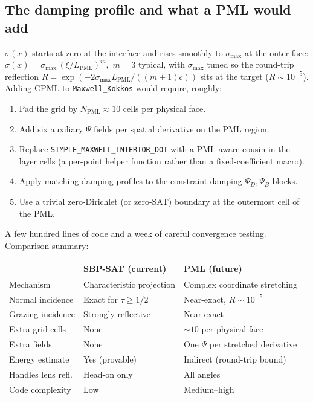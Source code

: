 \documentclass[11pt]{article}
\begin{document}
\subsection{The damping profile and what a PML would add}

$\sigma(x)$ starts at zero at the interface and rises smoothly to
$\sigma_{\max}$ at the outer face:
\(
  \sigma(x) = \sigma_{\max}\,(\xi/L_{\text{PML}})^m,
\)
$m = 3$ typical, with
$\sigma_{\max}$ tuned so the round-trip reflection
$R = \exp(-2\sigma_{\max} L_{\text{PML}}/((m+1)c))$ sits at the
target ($R \sim 10^{-5}$).  Adding CPML to
\texttt{Maxwell\_Kokkos} would require, roughly:
\begin{enumerate}[itemsep=1pt,topsep=2pt]
  \item Pad the grid by $N_{\text{PML}} \approx 10$ cells per
        physical face.
  \item Add six auxiliary $\Psi$ fields per spatial derivative on
        the PML region.
  \item Replace \texttt{SIMPLE\_MAXWELL\_INTERIOR\_DOT} with a
        PML-aware cousin in the layer cells (a per-point helper
        function rather than a fixed-coefficient macro).
  \item Apply matching damping profiles to the constraint-damping
        $\Psi_D, \Psi_B$ blocks.
  \item Use a trivial zero-Dirichlet (or zero-SAT) boundary at the
        outermost cell of the PML.
\end{enumerate}
A few hundred lines of code and a week of careful convergence
testing.  Comparison summary:

\begin{center}
\small
\begin{tabular}{lll}
\toprule
                   & SBP-SAT (current)                & PML (future) \\
\midrule
Mechanism          & Characteristic projection         & Complex coordinate stretching \\
Normal incidence   & Exact for $\tau \geq 1/2$         & Near-exact, $R \sim 10^{-5}$ \\
Grazing incidence  & Strongly reflective               & Near-exact \\
Extra grid cells   & None                              & $\sim 10$ per physical face \\
Extra fields       & None                              & One $\Psi$ per stretched derivative \\
Energy estimate    & Yes (provable)                    & Indirect (round-trip bound) \\
Handles lens refl. & Head-on only                      & All angles \\
Code complexity    & Low                               & Medium--high \\
\bottomrule
\end{tabular}
\end{center}
\end{document}
